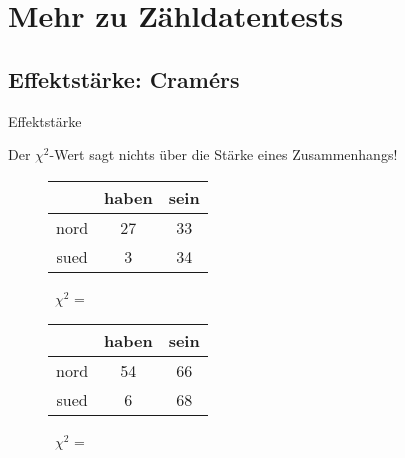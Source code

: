 \section{Mehr zu Zähldatentests}


\subsection[Effektstärke]{Effektstärke: Cramérs}

\begin{frame}{Effektstärke}

  Der $\chi^2$-Wert sagt nichts über die \alert{Stärke eines Zusammenhangs}!\\

  \begin{figure}[h]
    \centering
    \begin{tabular}{|c|c|c|}
      \hline
      &  haben & sein\\
      \hline
      nord   &  27      & 33 \\
      \hline
	sued   &   3      & 34 \\
      \hline
    \end{tabular}~$\chi^2$ = ~
  \end{figure}

  \begin{figure}[h]
    \centering
    \begin{tabular}{|c|c|c|}
      \hline
	    &  haben & sein\\
      \hline
	nord   &  54      & 66 \\
      \hline
	sued   &  6     & 68 \\
      \hline
      \end{tabular}~$\chi^2$ = ~
  \end{figure}
\end{frame}


